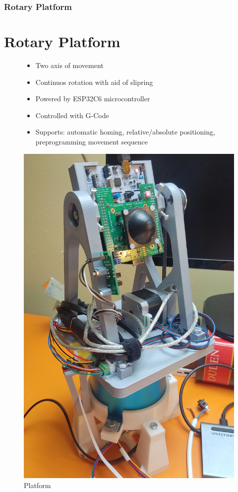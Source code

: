 \documentclass[aspectratio=43]{beamer}
\begin{document}
\begin{frame}[fragile]
  \frametitle{Rotary Platform}
  \section{Rotary Platform}
  \begin{figure}[!htb]
    \begin{minipage}{0.48\textwidth}
      \begin{itemize}
        \item Two axis of movement
        \item Continuos rotation with aid of slipring
        \item Powered by ESP32C6 microcontroller
        \item Controlled with G-Code
        \item Supports: automatic homing, relative/absolute positioning, preprogramming movement sequence
      \end{itemize}
    \end{minipage}\hfill
    \begin{minipage}{0.48\textwidth}
      \centering
      \includegraphics[width=.8\linewidth]{../img/assembly_photo.jpg}
      \caption{Platform}
    \end{minipage}
  \end{figure}
\end{frame}
\end{document}
